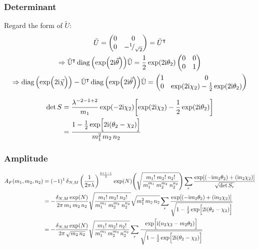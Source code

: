 \documentclass[
	english,
	a4paper,
	fontsize=10pt,
	parskip=half,
	titlepage=true,
	DIV=12,
	final
]{scrreprt}
\newcommand*{\Thus}{\ensuremath{\Rightarrow}\xspace}
\newcommand*{\smallfrac}  [2]{\ensuremath{{}^        {#1} \!/_        {#2}}}
\newcommand*{\transp}{\ensuremath{^\intercal}}
\newcommand*{\iunit}{\ensuremath{\mathrm{i}}}
\DeclareMathOperator{\diag}{diag}
\begin{document}
\subsubsection{Determinant}
Regard the form of $\tilde{U}$:
\begin{gather}
	\tilde{U}
=
	\begin{pmatrix}
		0 & 0 \\ 0 & -\smallfrac{1}{\sqrt{2}}
	\end{pmatrix}
=
	\tilde{U}\transp
\\
	\Thus
	\tilde{\mathbb{U}}\transp
	\diag\qty(\exp(2\iunit\vec{\theta}))
	\tilde{\mathbb{U}}
=
	\frac{1}{2} \exp(2\iunit \theta_2)
	\begin{pmatrix}
		0 & 0 \\ 0 & 1
	\end{pmatrix}
\\
	\Thus
	\diag\qty( \exp(\Big.2\iunit\vec{\chi}) )
	-
	\tilde{\mathbb{U}}\transp
	\diag\qty(\exp(2\iunit\vec{\theta}))
	\tilde{\mathbb{U}}
=
	\begin{pmatrix}
		1 & 0 \\
		0 & \exp(2\iunit \chi_2) - \frac{1}{2} \exp(2\iunit \theta_2)
	\end{pmatrix}	
\end{gather}

\begin{align}
	\det S
&=
	\frac{ \lambda^{-2 - 1 + 2} }{ m_1 }
	\exp(-2\iunit \chi_2)
	\qty[ 
		\exp(2\iunit \chi_2) - \frac{1}{2} \exp(2\iunit \theta_2)
	] \\
&=
	\frac
		{1 - \frac{1}{2} \exp[\Big. 2\iunit (\theta_2 - \chi_2)]}
		{m_1^2 \, m_2 \, n_2}
\end{align}

\subsubsection{Amplitude}
\begin{align}
	A_F(m_1, m_2, n_2)
&=
	(-1)^1 \, \delta_{N,M} \, \qty(
		\frac{1}{2\pi\lambda}
	)^{\frac{2 + 1 - 1}{2}}
	\exp(N)
	\qty(
		\sqrt{\frac
			{ m_1!      \; m_2!     \; n_2! }
			{ m_1^{m_1} \;m_2^{m_2} \; n_2^{n_2} }
	})
	\sum_r
		\frac
		{\exp[
			\qty(- \iunit m_2 \theta_2) + 
			\qty(  \iunit n_2 \chi  _2)
		]}
		{\sqrt{\det S_r}}
	\\
&=
\nonumber
	-\frac
		{\delta_{N,M} \exp(N)}
		{2\pi \, m_1 \, m_2 \, n_2}
	\sqrt{\frac
		{ m_1!      \; m_2!     \; n_2! }
		{ m_1^{m_1} \;m_2^{m_2} \; n_2^{n_2} }
	}
	\sqrt{m_1^2 \, m_2 \, n_2}
	\sum_r
		\frac
		{\exp[
			\qty(- \iunit m_2 \theta_2) + 
			\qty(  \iunit n_2 \chi  _2)
		]}
		{\sqrt{1 - \frac{1}{2} \exp[\Big. 2\iunit (\theta_2 - \chi_2)]}}
	\\
&=
	-\frac
		{\delta_{N,M} \exp(N)}
		{2\pi \, \sqrt{m_2 \, n_2}}
	\sqrt{\frac
		{ m_1!      \; m_2!     \; n_2! }
		{ m_1^{m_1} \,m_2^{m_2} \, n_2^{n_2} }
	}
	\sum_r \frac
		{\exp[ \Big. \iunit
			\qty( n_2 \chi_2 - m_2 \theta_2 )
		]}
		{\sqrt{1 - \frac{1}{2} \exp[\Big. 2\iunit (\theta_2 - \chi_2)]}}
\end{align}
\end{document}

